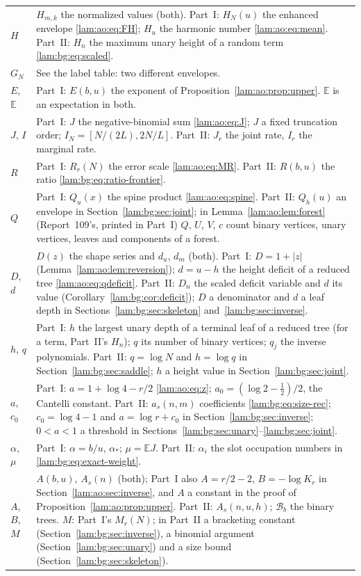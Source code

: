 \documentclass[11pt,a4paper]{article}
\numberwithin{equation}{section}
\theoremstyle{remark}
\newcommand{\E}{\mathbb E}
\begin{document}
\begin{longtable}{@{}>{\raggedright\arraybackslash}p{} >{\raggedright\arraybackslash}p{}@{}}
$H$ & $H_{m,k}$ the normalized values (both). Part~I: $H_N(u)$ the enhanced envelope \eqref{lam:ao:eq:FH}; $H_u$ the harmonic number \eqref{lam:ao:eq:mean}. Part~II: $H_n$ the maximum unary height of a random term \eqref{lam:bg:eq:scaled}.\\
$G_N$ & See the label table: two different envelopes.\\
$E$, $\E$ & Part~I: $E(b,u)$ the exponent of Proposition~\ref{lam:ao:prop:upper}. $\E$ is an expectation in both.\\
$J$, $I$ & Part~I: $J$ the negative-binomial sum \eqref{lam:ao:eq:J}; $J$ a fixed truncation order; $I_N=[N/(2L),2N/L]$. Part~II: $J_r$ the joint rate, $I_r$ the marginal rate.\\
$R$ & Part~I: $R_r(N)$ the error scale \eqref{lam:ao:eq:MR}. Part~II: $R(b,u)$ the ratio \eqref{lam:bg:eq:ratio-frontier}.\\
$Q$ & Part~I: $Q_u(x)$ the spine product \eqref{lam:ao:eq:spine}. Part~II: $Q_h(u)$ an envelope in Section~\ref{lam:bg:sec:joint}; in Lemma~\ref{lam:ao:lem:forest} (Report~109's, printed in Part~I) $Q$, $U$, $V$, $c$ count binary vertices, unary vertices, leaves and components of a forest.\\
$D$, $d$ & $D(z)$ the shape series and $d_u$, $d_m$ (both). Part~I: $D=1+|z|$ (Lemma~\ref{lam:ao:lem:reversion}); $d=u-h$ the height deficit of a reduced tree \eqref{lam:ao:eq:qdeficit}. Part~II: $D_n$ the scaled deficit variable and $d$ its value (Corollary~\ref{lam:bg:cor:deficit}); $D$ a denominator and $d$ a leaf depth in Sections~\ref{lam:bg:sec:skeleton} and~\ref{lam:bg:sec:inverse}.\\
$h$, $q$ & Part~I: $h$ the largest unary depth of a terminal leaf of a reduced tree (for a term, Part~II's $H_n$); $q$ its number of binary vertices; $q_j$ the inverse polynomials. Part~II: $q=\log N$ and $h=\log q$ in Section~\ref{lam:bg:sec:saddle}; $h$ a height value in Section~\ref{lam:bg:sec:joint}.\\
$a$, $c_0$ & Part~I: $a=1+\log4-r/2$ \eqref{lam:ao:eq:z}; $a_0=(\log2-\frac12)/2$, the Cantelli constant. Part~II: $a_s(n,m)$ coefficients \eqref{lam:bg:eq:size-rec}; $c_0=\log4-1$ and $a=\log r+c_0$ in Section~\ref{lam:bg:sec:inverse}; $0<a<1$ a threshold in Sections~\ref{lam:bg:sec:unary}--\ref{lam:bg:sec:joint}.\\
$\alpha$, $\mu$ & Part~I: $\alpha=b/u$, $\alpha_*$; $\mu=\E J$. Part~II: $\alpha_i$ the slot occupation numbers in \eqref{lam:bg:eq:exact-weight}.\\
$A$, $B$, $M$ & $A(b,u)$, $A_s(n)$ (both); Part~I also $A=r/2-2$, $B=-\log K_r$ in Section~\ref{lam:ao:sec:inverse}, and $A$ a constant in the proof of Proposition~\ref{lam:ao:prop:upper}. Part~II: $A_s(n,u,h)$; $\mathcal B_b$ the binary trees. $M$: Part~I's $M_r(N)$; in Part~II a bracketing constant (Section~\ref{lam:bg:sec:inverse}), a binomial argument (Section~\ref{lam:bg:sec:unary}) and a size bound (Section~\ref{lam:bg:sec:skeleton}).\\

\end{longtable}
\end{document}
